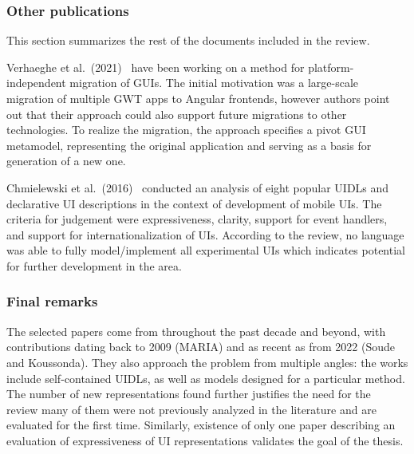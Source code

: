 \subsubsection{Other publications}

This section summarizes the rest of the documents included in the review.

Verhaeghe et al.\ (2021)~\cite{Verhaeghe2021visual, Verhaeghe2021behavior} have been working on a method for platform-independent migration of GUIs.
The initial motivation was a large-scale migration of multiple GWT apps to Angular frontends, however authors point out that their approach could also support future migrations to other technologies.
To realize the migration, the approach specifies a pivot GUI metamodel, representing the original application and serving as a basis for generation of a new one.

Chmielewski et al.\ (2016)~\cite{Chmielewski2016} conducted an analysis of eight popular UIDLs and declarative UI descriptions in the context of development of mobile UIs.
The criteria for judgement were expressiveness, clarity, support for event handlers, and support for internationalization of UIs.
According to the review, no language was able to fully model/implement all experimental UIs which indicates potential for further development in the area.

\subsubsection{Final remarks}

The selected papers come from throughout the past decade and beyond, with contributions dating back to 2009 (MARIA) and as recent as from 2022 (Soude and Koussonda).
They also approach the problem from multiple angles: the works include self-contained UIDLs, as well as models designed for a particular method.
The number of new representations found further justifies the need for the review\,\textendash\,many of them were not previously analyzed in the literature and are evaluated for the first time.
Similarly, existence of only one paper describing an evaluation of expressiveness of UI representations validates the goal of the thesis.
